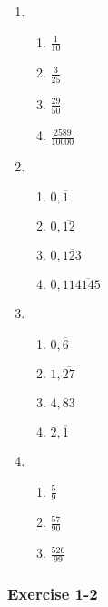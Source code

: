 {\begin{multicols}{3}
\begin{enumerate}[noitemsep, label=\textbf{\arabic*}. ]
 \item %
    \begin{enumerate}[noitemsep, label=\textbf{(\alph*)} ] 
    \item $\frac{1}{10}$
    \item $\frac{3}{25}$%
    \item $\frac{29}{50}$%
    \item $\frac{2589}{10000}$%
    \end{enumerate}
\item%
    \begin{enumerate}[noitemsep, label=\textbf{(\alph*)} ] 
    \item $0,\overline{1}$%
    \item $0,\overline{12}$%
    \item $0,\overline{123}$%
    \item $0,11\overline{4145}$%
    \end{enumerate}
\item %
    \begin{enumerate}[noitemsep, label=\textbf{(\alph*)} ] 
    \item $0,\overline{6}$%
    \item $1,\overline{27}$%
    \item $4,8\overline{3}$%
    \item $2,\overline{1}$%
    \end{enumerate}
\item %
    \begin{enumerate}[noitemsep, label=\textbf{(\alph*)} ] 
    \item $\frac{5}{9}$%
    \item $\frac{57}{90}$%
    \item $\frac{526}{99}$%
    \end{enumerate}
\end{enumerate}
\subsubsection*{Exercise 1-2} %


\end{multicols}}
